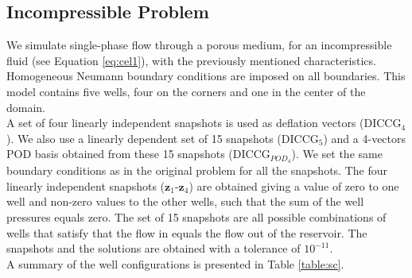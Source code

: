 \documentclass[12pt]{article}
\numberwithin{equation}{section}
\begin{document}
\subsection{Incompressible Problem}

We simulate single-phase flow through a porous medium, for an incompressible fluid (see Equation \eqref{eq:cel1}), with the previously mentioned characteristics. Homogeneous Neumann boundary conditions are imposed on all boundaries. This model contains five wells, four on the corners and one in the center of the domain. \\
A set of four linearly independent snapshots is used as deflation vectors (DICCG$_4$). We also use a linearly dependent set of 15 snapshots (DICCG$_5$) and a 4-vectors POD basis obtained from these 15 snapshots (DICCG$_{POD_4}$). We set the same boundary conditions as in the original problem for all the snapshots.
The four linearly independent snapshots ($\mathbf{z}_1$-$\mathbf{z}_4$) are obtained giving a value of zero to one well and non-zero values to the other wells, such that the sum of the well pressures equals zero. The set of 15 snapshots are all possible combinations of wells that satisfy that the flow in equals the flow out of the reservoir. The snapshots and the solutions are obtained with a tolerance of $10^{-11}$. \\
A summary of the well configurations is presented in Table \ref{table:sc}.
\renewcommand{\arraystretch}{1.3}
\end{document}
